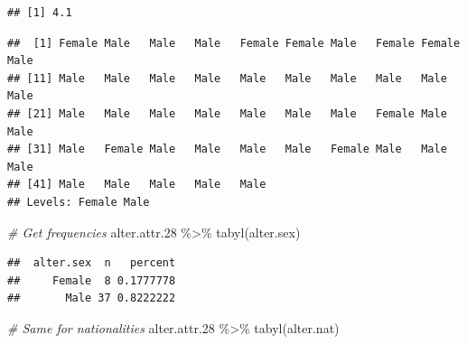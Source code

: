 \documentclass[
]{book}
\newenvironment{Shaded}{\begin{snugshade}}{\end{snugshade}}
\newcommand{\AttributeTok}[1]{\textcolor[rgb]{0.77,0.63,0.00}{#1}}
\newcommand{\CommentTok}[1]{\textcolor[rgb]{0.56,0.35,0.01}{\textit{#1}}}
\newcommand{\ConstantTok}[1]{\textcolor[rgb]{0.00,0.00,0.00}{#1}}
\newcommand{\FloatTok}[1]{\textcolor[rgb]{0.00,0.00,0.81}{#1}}
\newcommand{\FunctionTok}[1]{\textcolor[rgb]{0.00,0.00,0.00}{#1}}
\newcommand{\NormalTok}[1]{#1}
\newcommand{\SpecialCharTok}[1]{\textcolor[rgb]{0.00,0.00,0.00}{#1}}
\begin{document}
\begin{Shaded}
\end{Shaded}

\begin{verbatim}
## [1] 4.1
\end{verbatim}

\begin{Shaded}
\end{Shaded}

\begin{verbatim}
##  [1] Female Male   Male   Male   Female Female Male   Female Female Male  
## [11] Male   Male   Male   Male   Male   Male   Male   Male   Male   Male  
## [21] Male   Male   Male   Male   Male   Male   Male   Female Male   Male  
## [31] Male   Female Male   Male   Male   Male   Female Male   Male   Male  
## [41] Male   Male   Male   Male   Male  
## Levels: Female Male
\end{verbatim}

\begin{Shaded}
\begin{Highlighting}[]
\CommentTok{\# Get frequencies}
\NormalTok{alter.attr}\FloatTok{.28} \SpecialCharTok{\%\textgreater{}\%}
  \FunctionTok{tabyl}\NormalTok{(alter.sex)}
\end{Highlighting}
\end{Shaded}

\begin{verbatim}
##  alter.sex  n   percent
##     Female  8 0.1777778
##       Male 37 0.8222222
\end{verbatim}

\begin{Shaded}
\begin{Highlighting}[]
\CommentTok{\# Same for nationalities}
\NormalTok{alter.attr}\FloatTok{.28} \SpecialCharTok{\%\textgreater{}\%}
  \FunctionTok{tabyl}\NormalTok{(alter.nat)}
\end{Highlighting}
\end{Shaded}
\end{document}
